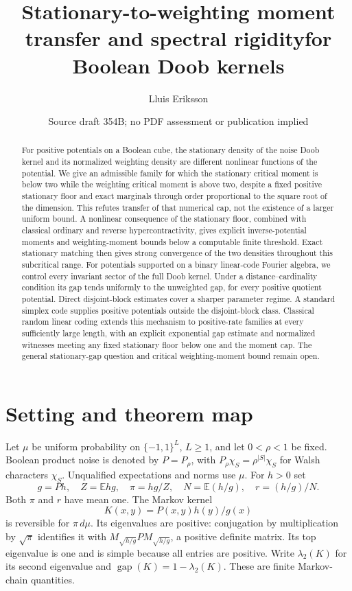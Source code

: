 \documentclass[11pt]{article}
\title{Stationary-to-weighting moment transfer and spectral rigidity\newline for Boolean Doob kernels}
\author{Lluis Eriksson}
\date{Source draft 354B; no PDF assessment or publication implied}
\newcommand{\E}{\mathbb E}
\begin{document}
\maketitle
\begin{abstract}
For positive potentials on a Boolean cube, the stationary density of the noise Doob kernel and its normalized weighting density are different nonlinear functions of the potential. We give an admissible family for which the stationary critical moment is below two while the weighting critical moment is above two, despite a fixed positive stationary floor and exact marginals through order proportional to the square root of the dimension. This refutes transfer of that numerical cap, not the existence of a larger uniform bound. A nonlinear consequence of the stationary floor, combined with classical ordinary and reverse hypercontractivity, gives explicit inverse-potential moments and weighting-moment bounds below a computable finite threshold. Exact stationary matching then gives strong convergence of the two densities throughout this subcritical range. For potentials supported on a binary linear-code Fourier algebra, we control every invariant sector of the full Doob kernel. Under a distance--cardinality condition its gap tends uniformly to the unweighted gap, for every positive quotient potential. Direct disjoint-block estimates cover a sharper parameter regime. A standard simplex code supplies positive potentials outside the disjoint-block class. Classical random linear coding extends this mechanism to positive-rate families at every sufficiently large length, with an explicit exponential gap estimate and normalized witnesses meeting any fixed stationary floor below one and the moment cap. The general stationary-gap question and critical weighting-moment bound remain open.
\end{abstract}

\section{Setting and theorem map}
Let $\mu$ be uniform probability on $\{-1,1\}^L$, $L\geq1$, and let $0<\rho<1$ be fixed. Boolean product noise is denoted by $P=P_\rho$, with $P_\rho\chi_S=\rho^{|S|}\chi_S$ for Walsh characters $\chi_S$. Unqualified expectations and norms use $\mu$. For $h>0$ set
\[
 g=Ph,\quad Z=\E hg,\quad \pi=hg/Z,\quad
 N=\E(h/g),\quad r=(h/g)/N.
\]
Both $\pi$ and $r$ have mean one. The Markov kernel
\[
 K(x,y)=P(x,y)h(y)/g(x)
\]
is reversible for $\pi\,d\mu$. Its eigenvalues are positive: conjugation by multiplication by $\sqrt\pi$ identifies it with
$M_{\sqrt{h/g}}P M_{\sqrt{h/g}}$, a positive definite matrix. Its top eigenvalue is one and is simple because all entries are positive. Write $\lambda_2(K)$ for its second eigenvalue and $\operatorname{gap}(K)=1-\lambda_2(K)$. These are finite Markov-chain quantities.
\end{document}
